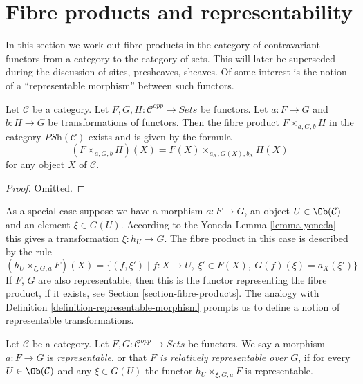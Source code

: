 \section{Fibre products and representability}
\label{section-representable-map-presheaves}

\noindent
In this section we work out fibre products in the
category of contravariant functors from a category
to the category of sets. This will later be superseded
during the discussion of sites, presheaves, sheaves. Of some
interest is the notion of a ``representable morphism'' between
such functors.

\begin{lemma}
\label{lemma-fibre-product-presheaves}
Let $\mathcal{C}$ be a category.
Let $F, G, H : \mathcal{C}^{opp} \to \textit{Sets}$
be functors. Let $a : F \to G$ and $b : H \to G$ be
transformations of functors. Then the fibre product
$F \times_{a, G, b} H$ in the category
$\textit{PSh}(\mathcal{C})$
exists and is given by the formula
$$
(F \times_{a, G, b} H)(X) =
F(X) \times_{a_X, G(X), b_X} H(X)
$$
for any object $X$ of $\mathcal{C}$.
\end{lemma}

\begin{proof}
Omitted.
\end{proof}

\noindent
As a special case suppose we have a morphism
$a : F \to G$, an object $U \in \Ob(\mathcal{C})$
and an element $\xi \in G(U)$. According to the Yoneda
Lemma \ref{lemma-yoneda} this gives a transformation
$\xi : h_U \to G$. The fibre product in this case
is described by the rule
$$
(h_U \times_{\xi, G, a} F)(X) =
\{ (f, \xi') \mid f : X \to U, \ \xi' \in F(X), \ G(f)(\xi) = a_X(\xi')\}
$$
If $F$, $G$ are also representable, then this is the functor representing the
fibre product, if it exists, see Section \ref{section-fibre-products}.
The analogy with Definition \ref{definition-representable-morphism}
prompts us to define a notion
of representable transformations.

\begin{definition}
\label{definition-representable-map-presheaves}
Let $\mathcal{C}$ be a category.
Let $F, G : \mathcal{C}^{opp} \to \textit{Sets}$
be functors. We say a morphism $a : F \to G$ is
{\it representable}, or that {\it $F$ is relatively representable
over $G$}, if for every $U \in \Ob(\mathcal{C})$
and any $\xi \in G(U)$ the functor
$h_U \times_{\xi, G, a} F$ is representable.
\end{definition}


